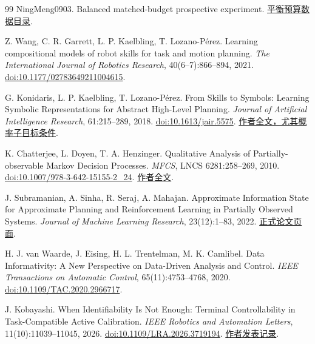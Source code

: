 \documentclass[11pt,a4paper,fontset=fandol]{ctexart}
\theoremstyle{definition}
\theoremstyle{remark}\newtheorem{remark}[theorem]{说明}
\numberwithin{equation}{section}
\begin{document}
\begin{thebibliography}{99}
NingMeng0903. Balanced matched-budget prospective experiment.
\href{https://github.com/NingMeng0903/RealUS_playground/tree/190e9e3cec96f2a467884b545e465364cfc76501/NMI_idea/experiments/v852/2026-11-08/third_party_review/data/v852_matched_budget_balanced_20261108}{平衡预算数据目录}.

Z. Wang, C. R. Garrett, L. P. Kaelbling, T. Lozano-Pérez.
Learning compositional models of robot skills for task and motion planning.
\emph{The International Journal of Robotics Research}, 40(6--7):866--894, 2021.
\href{https://doi.org/10.1177/02783649211004615}{doi:10.1177/02783649211004615}.

G. Konidaris, L. P. Kaelbling, T. Lozano-Pérez.
From Skills to Symbols: Learning Symbolic Representations for Abstract High-Level Planning.
\emph{Journal of Artificial Intelligence Research}, 61:215--289, 2018.
\href{https://doi.org/10.1613/jair.5575}{doi:10.1613/jair.5575}.
\href{https://cs.brown.edu/people/gdk/pubs/orig_sym_jair.pdf}{作者全文，尤其概率子目标条件}.

K. Chatterjee, L. Doyen, T. A. Henzinger.
Qualitative Analysis of Partially-observable Markov Decision Processes.
\emph{MFCS}, LNCS 6281:258--269, 2010.
\href{https://doi.org/10.1007/978-3-642-15155-2_24}{doi:10.1007/978-3-642-15155-2\_24}.
\href{https://lsv.ens-paris-saclay.fr/Publis/PAPERS/PDF/CDH-mfcs10.pdf}{作者全文}.

J. Subramanian, A. Sinha, R. Seraj, A. Mahajan.
Approximate Information State for Approximate Planning and Reinforcement Learning in Partially Observed Systems.
\emph{Journal of Machine Learning Research}, 23(12):1--83, 2022.
\href{https://jmlr.org/papers/v23/20-1165.html}{正式论文页面}.

H. J. van Waarde, J. Eising, H. L. Trentelman, M. K. Camlibel.
Data Informativity: A New Perspective on Data-Driven Analysis and Control.
\emph{IEEE Transactions on Automatic Control}, 65(11):4753--4768, 2020.
\href{https://doi.org/10.1109/TAC.2020.2966717}{doi:10.1109/TAC.2020.2966717}.

J. Kobayashi.
When Identifiability Is Not Enough: Terminal Controllability in Task-Compatible Active Calibration.
\emph{IEEE Robotics and Automation Letters}, 11(10):11039--11045, 2026.
\href{https://doi.org/10.1109/LRA.2026.3719194}{doi:10.1109/LRA.2026.3719194}.
\href{https://jkoba0512.github.io/jkoba-lab/publications/}{作者发表记录}.


\end{thebibliography}
\end{document}

